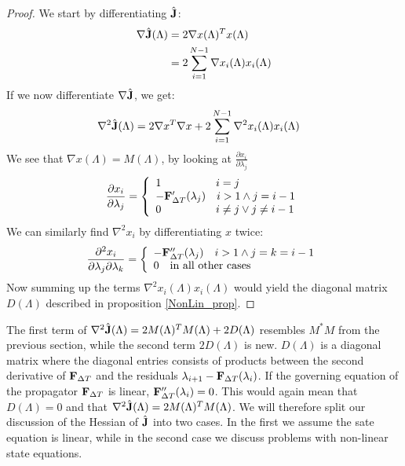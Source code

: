 \begin{proof}
We start by differentiating $\hat{\bold J}$:
\begin{align*}
\nabla \hat{\bold J}(\Lambda) &= 2 \nabla x(\Lambda)^T x(\Lambda)\\
&=2\sum_{i=1}^{N-1} \nabla x_i(\Lambda) x_i(\Lambda)
\end{align*}
If we now differentiate $\nabla \hat{\bold J}$, we get:
\begin{align*}
\nabla^2 \hat{\bold J}(\Lambda) &= 2\nabla x^T\nabla x + 2\sum_{i=1}^{N-1} \nabla^2 x_i(\Lambda) x_i(\Lambda)
\end{align*}
We see that $\nabla x(\Lambda)=M(\Lambda)$, by looking at $\frac{\partial x_i}{\partial \lambda_j}$
\begin{align*}
\frac{\partial x_i}{\partial \lambda_j} = \left\{
     \begin{array}{lr}
		1 \quad\quad\quad\quad\quad i=j\\
		-\bold F_{\Delta T}'(\lambda_{j}) \quad i>1 \wedge j=i-1 \\
		0 \quad\quad\quad\quad\quad i\neq j \vee j\neq i-1
	\end{array}
   \right.	
\end{align*}
We can similarly find $\nabla^2 x_i$ by differentiating $x$ twice:
\begin{align*}
\frac{\partial^2 x_i}{\partial \lambda_j\partial\lambda_k} = \left\{
     \begin{array}{lr}
		-\bold F_{\Delta T}''(\lambda_{j}) \quad i>1 \wedge j=k=i-1 \\
		0 \quad\textrm{in all other cases}
	\end{array}
   \right.	
\end{align*}
Now summing up the terms $\nabla^2 x_i(\Lambda)x_i(\Lambda)$ would yield the diagonal matrix $D(\Lambda)$ described in proposition \ref{NonLin_prop}.
\end{proof}
\noindent
The first term of $\nabla^2 \hat{\bold J}(\Lambda)=2M(\Lambda)^TM(\Lambda) + 2D(\Lambda)$ resembles $M^*M$ from the previous section, while the second term $2D(\Lambda)$ is new. $D(\Lambda)$ is a diagonal matrix where the diagonal entries consists of products between the second derivative of $\bold F_ {\Delta T}$ and the residuals $\lambda_{i+1}-\bold F_{\Delta T}(\lambda_i)$. If the governing equation of the propagator $\bold F_ {\Delta T}$ is linear, $\bold F_{\Delta T}''(\lambda_i)=0$. This would again mean that $D(\Lambda)=0$ and that $\nabla^2 \hat{\bold J}(\Lambda)=2M(\Lambda)^TM(\Lambda)$. We will therefore split our discussion of the Hessian of $\hat{\bold J}$ into two cases. In the first we assume the sate equation is linear, while in the second case we discuss problems with non-linear state equations.
